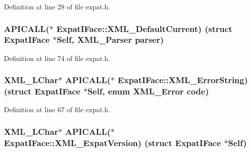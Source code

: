 Definition at line 28 of file expat.\+h.

\subsubsection[{\texorpdfstring{X\+M\+L\+\_\+\+Default\+Current}{XML_DefaultCurrent}}]{ A\+P\+I\+C\+A\+LL($\ast$ Expat\+I\+Face\+::\+X\+M\+L\+\_\+\+Default\+Current) (struct {\bf Expat\+I\+Face} $\ast$Self, {\bf X\+M\+L\+\_\+\+Parser} parser)}\hypertarget{struct_expat_i_face_a0be31c9a487fe69c4c448cb88ab8db6c}{}\label{struct_expat_i_face_a0be31c9a487fe69c4c448cb88ab8db6c}


Definition at line 74 of file expat.\+h.

\subsubsection[{\texorpdfstring{X\+M\+L\+\_\+\+Error\+String}{XML_ErrorString}}]{ {\bf X\+M\+L\+\_\+\+L\+Char}$\ast$ A\+P\+I\+C\+A\+LL($\ast$ Expat\+I\+Face\+::\+X\+M\+L\+\_\+\+Error\+String) (struct {\bf Expat\+I\+Face} $\ast$Self, enum {\bf X\+M\+L\+\_\+\+Error} code)}\hypertarget{struct_expat_i_face_ad55c2849747736ab7d56b52557c7ed82}{}\label{struct_expat_i_face_ad55c2849747736ab7d56b52557c7ed82}


Definition at line 67 of file expat.\+h.

\subsubsection[{\texorpdfstring{X\+M\+L\+\_\+\+Expat\+Version}{XML_ExpatVersion}}]{ {\bf X\+M\+L\+\_\+\+L\+Char}$\ast$ A\+P\+I\+C\+A\+LL($\ast$ Expat\+I\+Face\+::\+X\+M\+L\+\_\+\+Expat\+Version) (struct {\bf Expat\+I\+Face} $\ast$Self)}\hypertarget{struct_expat_i_face_a768efefce7ca6fb95d8461e82aa42ad5}{}\label{struct_expat_i_face_a768efefce7ca6fb95d8461e82aa42ad5}


